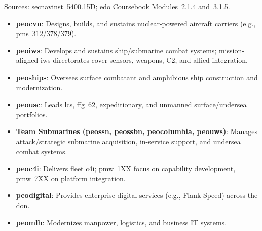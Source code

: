 \documentclass[../main.tex]{subfiles}
\begin{document}
\begin{description}[style=nextline, labelsep=0.5em, font=\bfseries]
  \item[\textbf{Program Executive Offices (Navy portfolios).}]
        Sources: \ac{secnavinst}~5400.15D; \ac{edo} Coursebook Modules~2.1.4 and~3.1.5.
        \begin{itemize}
          \item \textbf{\ac{peocvn}}: Designs, builds, and sustains nuclear-powered aircraft carriers (e.g., \ac{pms}~312/378/379).
          \item \textbf{\ac{peoiws}}: Develops and sustains ship/submarine combat systems; mission-aligned \ac{iws} directorates cover sensors, weapons, C2, and allied integration.
          \item \textbf{\ac{peoships}}: Oversees surface combatant and amphibious ship construction and modernization.
          \item \textbf{\ac{peousc}}: Leads \ac{lcs}, \ac{ffg}~62, expeditionary, and unmanned surface/undersea portfolios.
          \item \textbf{Team Submarines (\ac{peossn}, \ac{peossbn}, \ac{peocolumbia}, \ac{peouws})}: Manages attack/strategic submarine acquisition, in-service support, and undersea combat systems.
          \item \textbf{\ac{peoc4i}}: Delivers fleet \ac{c4i}; \ac{pmw}~1XX focus on capability development, \ac{pmw}~7XX on platform integration.
          \item \textbf{\ac{peodigital}}: Provides enterprise digital services (e.g., Flank Speed) across the \ac{don}.
          \item \textbf{\ac{peomlb}}: Modernizes manpower, logistics, and business IT systems.
        \end{itemize}


\end{description}
\end{document}
